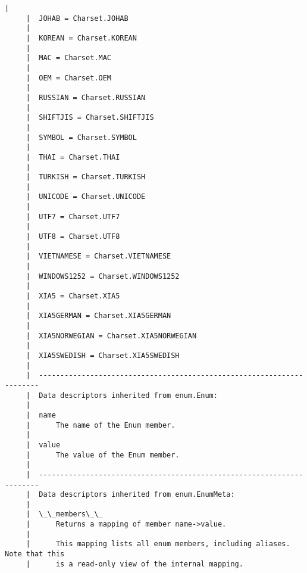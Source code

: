 \documentclass[11pt]{article}
\begin{document}
\begin{Verbatim}[commandchars=\\\{\}]
     |  
     |  JOHAB = Charset.JOHAB
     |  
     |  KOREAN = Charset.KOREAN
     |  
     |  MAC = Charset.MAC
     |  
     |  OEM = Charset.OEM
     |  
     |  RUSSIAN = Charset.RUSSIAN
     |  
     |  SHIFTJIS = Charset.SHIFTJIS
     |  
     |  SYMBOL = Charset.SYMBOL
     |  
     |  THAI = Charset.THAI
     |  
     |  TURKISH = Charset.TURKISH
     |  
     |  UNICODE = Charset.UNICODE
     |  
     |  UTF7 = Charset.UTF7
     |  
     |  UTF8 = Charset.UTF8
     |  
     |  VIETNAMESE = Charset.VIETNAMESE
     |  
     |  WINDOWS1252 = Charset.WINDOWS1252
     |  
     |  XIA5 = Charset.XIA5
     |  
     |  XIA5GERMAN = Charset.XIA5GERMAN
     |  
     |  XIA5NORWEGIAN = Charset.XIA5NORWEGIAN
     |  
     |  XIA5SWEDISH = Charset.XIA5SWEDISH
     |  
     |  ----------------------------------------------------------------------
     |  Data descriptors inherited from enum.Enum:
     |  
     |  name
     |      The name of the Enum member.
     |  
     |  value
     |      The value of the Enum member.
     |  
     |  ----------------------------------------------------------------------
     |  Data descriptors inherited from enum.EnumMeta:
     |  
     |  \_\_members\_\_
     |      Returns a mapping of member name->value.
     |      
     |      This mapping lists all enum members, including aliases. Note that this
     |      is a read-only view of the internal mapping.
    

\end{Verbatim}
\end{document}
